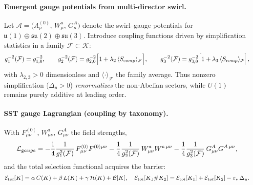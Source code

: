 \documentclass[11pt]{article}
\begin{document}
        \paragraph{Emergent gauge potentials from multi-director swirl.}
            Let \(\mathcal A=\big(A_\mu^{(0)},\,W_\mu^a,\,G_\mu^A\big)\) denote the swirl–gauge potentials for
            \(\mathfrak u(1)\oplus\mathfrak{su}(2)\oplus\mathfrak{su}(3)\).
            Introduce coupling functions driven by simplification statistics in a family \(\mathcal F\subset\mathcal K\):
            \[
                g_1^{-2}(\mathcal F)=g_{1,0}^{-2},\qquad
                g_2^{-2}(\mathcal F)=g_{2,0}^{-2}\Bigl[1+\lambda_2\,\langle S_{\textrm comp}\rangle_{\mathcal F}\Bigr],
                \qquad
                g_3^{-2}(\mathcal F)=g_{3,0}^{-2}\Bigl[1+\lambda_3\,\langle S_{\textrm comp}\rangle_{\mathcal F}\Bigr],
            \]
            with \(\lambda_{2,3}>0\) dimensionless and \(\langle\cdot\rangle_{\mathcal F}\) the family average.
            Thus nonzero simplification (\(\Delta_u>0\)) \emph{renormalizes} the non-Abelian sectors, while \(U(1)\) remains purely additive at leading order.

        \paragraph{SST gauge Lagrangian (coupling by taxonomy).}
            With \(F_{\mu\nu}^{(0)},\,W_{\mu\nu}^a,\,G_{\mu\nu}^A\) the field strengths,
            \[
                \mathcal L_{\textrm gauge}
                =-\frac{1}{4}\frac{1}{g_1^2(\mathcal F)}\,F_{\mu\nu}^{(0)}F^{(0)\mu\nu}
                -\frac{1}{4}\frac{1}{g_2^2(\mathcal F)}\,W_{\mu\nu}^{a}W^{a\,\mu\nu}
                -\frac{1}{4}\frac{1}{g_3^2(\mathcal F)}\,G_{\mu\nu}^{A}G^{A\,\mu\nu},
            \]
            and the total selection functional acquires the barrier:
            \[
                \mathcal E_{\textrm tot}[K]=\alpha\,C(K)+\beta\,L(K)+\gamma\,\mathcal H(K)+\mathcal B[K],
                \quad
                \mathcal E_{\textrm tot}[K_1\#K_2]
                =\mathcal E_{\textrm tot}[K_1]+\mathcal E_{\textrm tot}[K_2]-\varepsilon_*\,\Delta_u.
            \]
\end{document}

